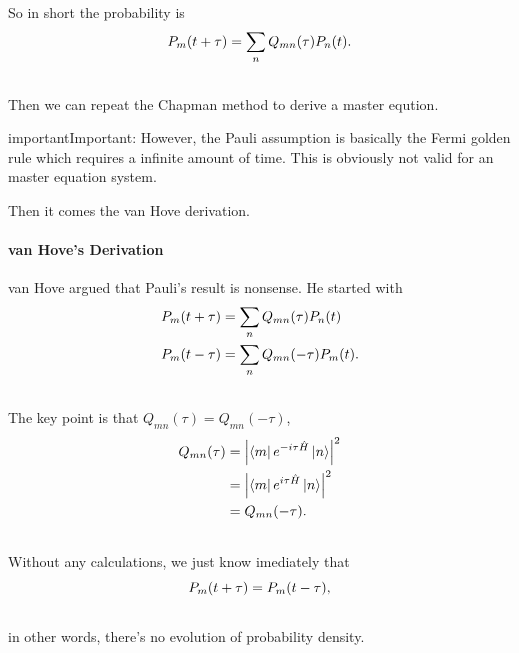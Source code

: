 \documentclass[letterpaper,10pt,english]{sphinxmanual}
\newcommand{\bra}[1]{\left\langle #1\right|}
\newcommand{\ket}[1]{\left| #1\right\rangle}
\begin{document}
So in short the probability is
\begin{gather}
\begin{split}P_m(t+\tau) = \sum_n Q_{mn}(\tau)P_n(t).\end{split}\notag\\\begin{split}\end{split}\notag
\end{gather}
Then we can repeat the Chapman method to derive a master eqution.

\begin{notice}{important}{Important:}
However, the Pauli assumption is basically the Fermi golden rule which requires a infinite amount of time. This is obviously not valid for an master equation system.
\end{notice}

Then it comes the van Hove derivation.


\paragraph{van Hove's Derivation}
\label{nonequilibrium/quantumMasterEqn:van-hove-s-derivation}
van Hove argued that Pauli's result is nonsense. He started with
\begin{gather}
\begin{split}P_m(t+\tau) &= \sum_n Q_{mn}(\tau) P_n(t) \\
P_m(t-\tau) & = \sum_n Q_{mn}(-\tau) P_m(t) .\end{split}\notag\\\begin{split}\end{split}\notag
\end{gather}
The key point is that $Q_{mn}(\tau) = Q_{mn}(-\tau)$,
\begin{gather}
\begin{split}Q_{mn}(\tau) & = \left\vert \bra{m} e^{-i\tau \hat H} \ket{n}  \right\vert^2 \\
& = \left\vert \bra{m} e^{i\tau \hat H} \ket{n}  \right\vert^2 \\
& = Q_{mn}(-\tau) .\end{split}\notag\\\begin{split}\end{split}\notag
\end{gather}
Without any calculations, we just know imediately that
\begin{gather}
\begin{split}P_m(t+\tau) = P_m(t-\tau) ,\end{split}\notag\\\begin{split}\end{split}\notag
\end{gather}
in other words, there's no evolution of probability density.
\end{document}
